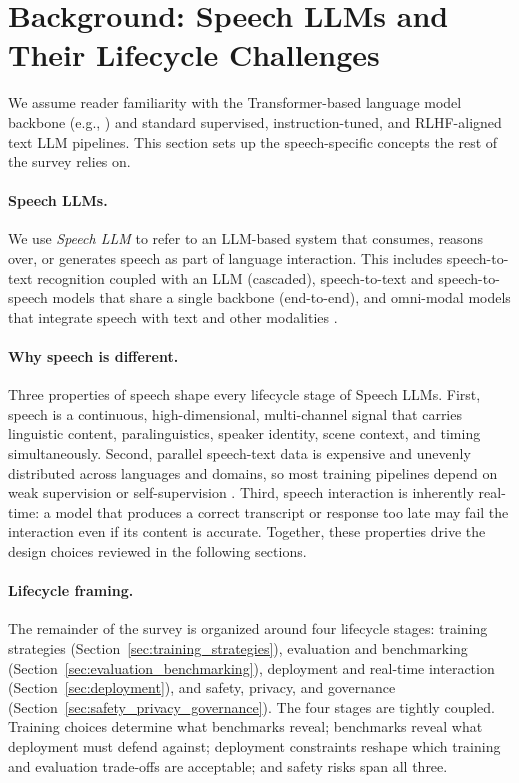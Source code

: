 \section{Background: Speech LLMs and Their Lifecycle Challenges}
\label{sec:background}

We assume reader familiarity with the Transformer-based language model
backbone (e.g., \citep{vaswani2017attention,radford2019language,brown2020language})
and standard supervised, instruction-tuned, and RLHF-aligned text LLM
pipelines. This section sets up the speech-specific concepts the rest of
the survey relies on.

\paragraph{Speech LLMs.}
We use \emph{Speech LLM} to refer to an LLM-based system that consumes,
reasons over, or generates speech as part of language interaction. This
includes speech-to-text recognition coupled with an LLM (cascaded),
speech-to-text and speech-to-speech models that share a single backbone
(end-to-end), and omni-modal models that integrate speech with text and
other modalities \citep{cui2024recent,peng2025surveyspeechlargelanguage}.

\paragraph{Why speech is different.}
Three properties of speech shape every lifecycle stage of Speech LLMs.
First, speech is a continuous, high-dimensional, multi-channel signal that
carries linguistic content, paralinguistics, speaker identity, scene
context, and timing simultaneously. Second, parallel speech-text data is
expensive and unevenly distributed across languages and domains, so most
training pipelines depend on weak supervision or self-supervision
\citep{radford2023robust,hsu2021hubert}. Third, speech interaction is
inherently real-time: a model that produces a correct transcript or
response too late may fail the interaction even if its content is
accurate. Together, these properties drive the design choices reviewed in
the following sections.

\paragraph{Lifecycle framing.}
The remainder of the survey is organized around four lifecycle stages:
training strategies (Section~\ref{sec:training_strategies}), evaluation
and benchmarking (Section~\ref{sec:evaluation_benchmarking}), deployment
and real-time interaction (Section~\ref{sec:deployment}), and safety,
privacy, and governance (Section~\ref{sec:safety_privacy_governance}).
The four stages are tightly coupled. Training choices determine what
benchmarks reveal; benchmarks reveal what deployment must defend
against; deployment constraints reshape which training and evaluation
trade-offs are acceptable; and safety risks span all three.
